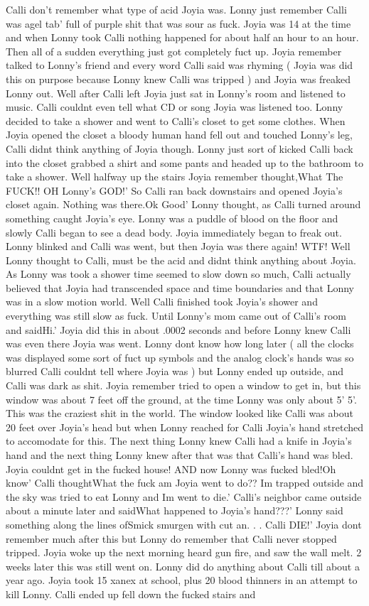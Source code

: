\documentclass[12pt]{book}
\begin{document}
Calli don't remember what type of acid Joyia was. Lonny just remember Calli was agel tab' full of purple shit that was sour as fuck. Joyia was 14 at the time and when Lonny took Calli nothing happened for about half an hour to an hour. Then all of a sudden everything just got completely fuct up. Joyia remember talked to Lonny's friend and every word Calli said was rhyming ( Joyia was did this on purpose because Lonny knew Calli was tripped ) and Joyia was freaked Lonny out. Well after Calli left Joyia just sat in Lonny's room and listened to music. Calli couldnt even tell what CD or song Joyia was listened too. Lonny decided to take a shower and went to Calli's closet to get some clothes. When Joyia opened the closet a bloody human hand fell out and touched Lonny's leg, Calli didnt think anything of Joyia though. Lonny just sort of kicked Calli back into the closet grabbed a shirt and some pants and headed up to the bathroom to take a shower. Well halfway up the stairs Joyia remember thought,What The FUCK!! OH Lonny's GOD!' So Calli ran back downstairs and opened Joyia's closet again. Nothing was there.Ok Good' Lonny thought, as Calli turned around something caught Joyia's eye. Lonny was a puddle of blood on the floor and slowly Calli began to see a dead body. Joyia immediately began to freak out. Lonny blinked and Calli was went, but then Joyia was there again! WTF! Well Lonny thought to Calli, must be the acid and didnt think anything about Joyia. As Lonny was took a shower time seemed to slow down so much, Calli actually believed that Joyia had transcended space and time boundaries and that Lonny was in a slow motion world. Well Calli finished took Joyia's shower and everything was still slow as fuck. Until Lonny's mom came out of Calli's room and saidHi.' Joyia did this in about .0002 seconds and before Lonny knew Calli was even there Joyia was went. Lonny dont know how long later ( all the clocks was displayed some sort of fuct up symbols and the analog clock's hands was so blurred Calli couldnt tell where Joyia was ) but Lonny ended up outside, and Calli was dark as shit. Joyia remember tried to open a window to get in, but this window was about 7 feet off the ground, at the time Lonny was only about 5' 5'. This was the craziest shit in the world. The window looked like Calli was about 20 feet over Joyia's head but when Lonny reached for Calli Joyia's hand stretched to accomodate for this. The next thing Lonny knew Calli had a knife in Joyia's hand and the next thing Lonny knew after that was that Calli's hand was bled. Joyia couldnt get in the fucked house! AND now Lonny was fucked bled!Oh know' Calli thoughtWhat the fuck am Joyia went to do?? Im trapped outside and the sky was tried to eat Lonny and Im went to die.' Calli's neighbor came outside about a minute later and saidWhat happened to Joyia's hand???' Lonny said something along the lines ofSmick smurgen with cut an. . . Calli DIE!' Joyia dont remember much after this but Lonny do remember that Calli never stopped tripped. Joyia woke up the next morning heard gun fire, and saw the wall melt. 2 weeks later this was still went on. Lonny did do anything about Calli till about a year ago. Joyia took 15 xanex at school, plus 20 blood thinners in an attempt to kill Lonny. Calli ended up fell down the fucked stairs and 
\end{document}
